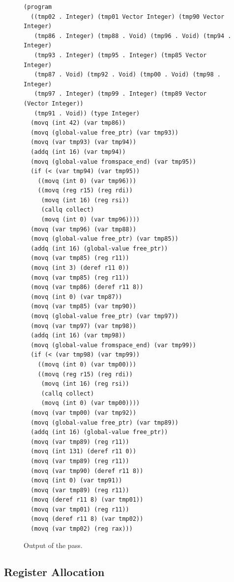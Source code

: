 \documentclass[11pt]{book}
\begin{document}
\begin{figure}[tbp]
\centering
\begin{minipage}{0.75\textwidth}
\begin{lstlisting}[basicstyle=\ttfamily\footnotesize]
(program
  ((tmp02 . Integer) (tmp01 Vector Integer) (tmp90 Vector Integer)
   (tmp86 . Integer) (tmp88 . Void) (tmp96 . Void) (tmp94 . Integer)
   (tmp93 . Integer) (tmp95 . Integer) (tmp85 Vector Integer)
   (tmp87 . Void) (tmp92 . Void) (tmp00 . Void) (tmp98 . Integer)
   (tmp97 . Integer) (tmp99 . Integer) (tmp89 Vector (Vector Integer))
   (tmp91 . Void)) (type Integer)
  (movq (int 42) (var tmp86))
  (movq (global-value free_ptr) (var tmp93))
  (movq (var tmp93) (var tmp94))
  (addq (int 16) (var tmp94))
  (movq (global-value fromspace_end) (var tmp95))
  (if (< (var tmp94) (var tmp95))
    ((movq (int 0) (var tmp96)))
    ((movq (reg r15) (reg rdi))
     (movq (int 16) (reg rsi))
     (callq collect)
     (movq (int 0) (var tmp96))))
  (movq (var tmp96) (var tmp88))
  (movq (global-value free_ptr) (var tmp85))
  (addq (int 16) (global-value free_ptr))
  (movq (var tmp85) (reg r11))
  (movq (int 3) (deref r11 0))
  (movq (var tmp85) (reg r11))
  (movq (var tmp86) (deref r11 8))
  (movq (int 0) (var tmp87))
  (movq (var tmp85) (var tmp90))
  (movq (global-value free_ptr) (var tmp97))
  (movq (var tmp97) (var tmp98))
  (addq (int 16) (var tmp98))
  (movq (global-value fromspace_end) (var tmp99))
  (if (< (var tmp98) (var tmp99))
    ((movq (int 0) (var tmp00)))
    ((movq (reg r15) (reg rdi))
     (movq (int 16) (reg rsi))
     (callq collect)
     (movq (int 0) (var tmp00))))
  (movq (var tmp00) (var tmp92))
  (movq (global-value free_ptr) (var tmp89))
  (addq (int 16) (global-value free_ptr))
  (movq (var tmp89) (reg r11))
  (movq (int 131) (deref r11 0))
  (movq (var tmp89) (reg r11))
  (movq (var tmp90) (deref r11 8))
  (movq (int 0) (var tmp91))
  (movq (var tmp89) (reg r11))
  (movq (deref r11 8) (var tmp01))
  (movq (var tmp01) (reg r11))
  (movq (deref r11 8) (var tmp02))
  (movq (var tmp02) (reg rax)))
\end{lstlisting}
\end{minipage}
\caption{Output of the  pass.}
\label{fig:select-instr-output-gc}
\end{figure}

\clearpage

\subsection{Register Allocation}
\label{sec:reg-alloc-gc}
\end{document}
